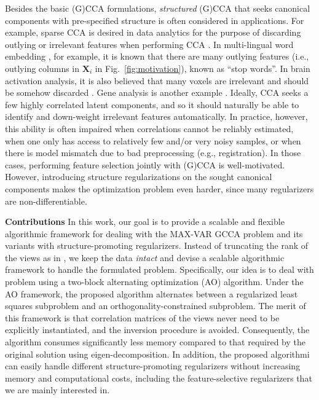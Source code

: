 \documentclass[10pt,journal]{IEEEtran}
\newcommand{\X}{\boldsymbol{X}}
\begin{document}
Besides the basic (G)CCA formulations, \emph{structured} (G)CCA \cite{hardoon2011sparse} that
seeks canonical components with pre-specified structure is often considered in applications.
For example, sparse CCA is desired in data analytics for the purpose of discarding outlying or irrelevant features when performing CCA \cite{witten2009penalized,chen2012structured,witten2009extensions}.
In multi-lingual word embedding \cite{faruqui2014improving,sun2011canonical,rastogimultiview}, for example, it is known that there are many outlying features (i.e., outlying columns in $\X_i$ in Fig.~\ref{fig:motivation}), known as ``stop words''. In brain activation analysis, it is also believed that many voxels are irrelevant and should be somehow discarded \cite{rustandi2009integrating,mitchell2008predicting}. Gene analysis is another example \cite{witten2009penalized,chen2012structured,witten2009extensions}.
Ideally, CCA seeks a few highly correlated latent components, and so it should naturally be able to identify and down-weight irrelevant features automatically. In practice, however, this ability is often impaired when correlations cannot be reliably estimated, when one only has access to relatively few and/or very noisy samples, or when there is model mismatch due to bad preprocessing (e.g., registration). In those cases, performing feature selection jointly with (G)CCA is well-motivated. However, introducing structure regularizations on the sought canonical components makes the optimization problem even harder, since many regularizers are non-differentiable.

\bigskip

\noindent
{\bf Contributions}
In this work, 
our goal is to provide a scalable and flexible algorithmic framework for dealing with
the MAX-VAR GCCA problem and its variants with structure-promoting regularizers.
Instead of truncating the rank of the views as in \cite{rastogimultiview}, we keep the data \emph{intact} and devise a scalable algorithmic framework to handle the formulated problem.
Specifically, our idea is to deal with problem using a two-block alternating optimization (AO) algorithm.
Under the AO framework, the proposed algorithm alternates between a regularized least squares subproblem and an orthogonality-constrained subproblem.
The merit of this framework is that correlation matrices of the views never need to be explicitly instantiated, and the inversion procedure is avoided. 
Consequently, the algorithm consumes significantly less memory compared to that required by the original solution using eigen-decomposition.
In addition, the proposed algorithmi can easily handle
different structure-promoting regularizers without increasing memory and computational costs, including the feature-selective regularizers that we
are mainly interested in.
\end{document}
